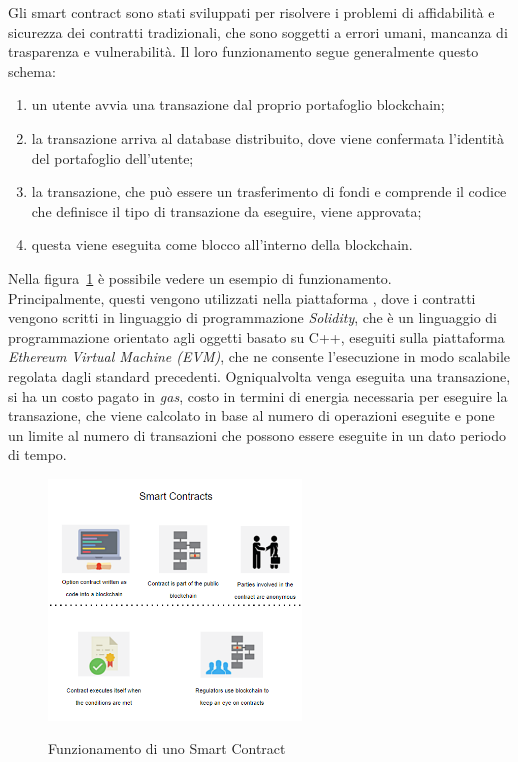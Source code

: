 Gli smart contract sono stati sviluppati per risolvere i problemi di affidabilità e sicurezza dei contratti tradizionali, che sono soggetti a errori umani, mancanza di trasparenza e vulnerabilità.
Il loro funzionamento segue generalmente questo schema:
\begin{enumerate}
    \item un utente avvia una transazione dal proprio portafoglio blockchain;
    \item la transazione arriva al database distribuito, dove viene confermata l'identità del portafoglio dell'utente;
    \item la transazione, che può essere un trasferimento di fondi e comprende il codice che definisce il tipo di transazione da eseguire, viene approvata;
    \item questa viene eseguita come blocco all'interno della blockchain.
\end{enumerate}
Nella figura~\ref{fig:smart-contract} è possibile vedere un esempio di funzionamento. \\

Principalmente, questi vengono utilizzati nella piattaforma , dove i contratti vengono scritti in linguaggio di programmazione \textit{Solidity}, 
che è un linguaggio di programmazione orientato agli oggetti basato su C++,
eseguiti sulla piattaforma \textit{Ethereum Virtual Machine (EVM)}, che ne consente l'esecuzione in modo scalabile regolata dagli standard precedenti.
Ogniqualvolta venga eseguita una transazione, si ha un costo pagato in \textit{gas}, costo in termini di energia necessaria per eseguire la transazione, che viene calcolato in base al numero di operazioni eseguite
e pone un limite al numero di transazioni che possono essere eseguite in un dato periodo di tempo. \\

\begin{figure}[h]
    \centering
    \includegraphics[width=0.6\textwidth, alt={Come funziona uno Smart Contract}]{immagini/smart-contract.png}
    \caption{Funzionamento di uno Smart Contract}\label{fig:smart-contract}
\end{figure}

